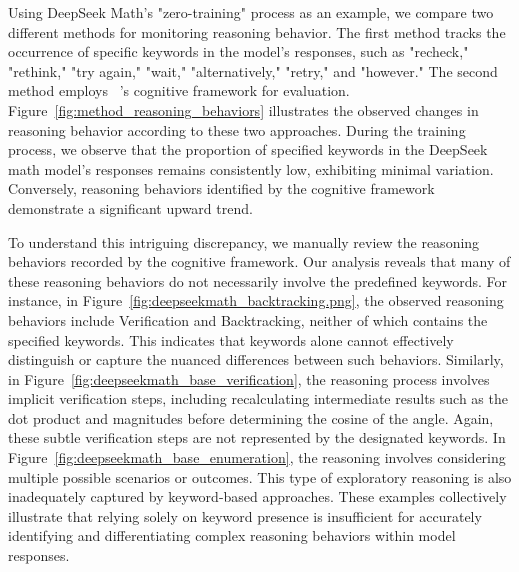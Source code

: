 

Using DeepSeek Math's "zero-training" process as an example, we compare two different methods for monitoring reasoning behavior. The first method tracks the occurrence of specific keywords in the model's responses, such as "recheck," "rethink," "try again," "wait," "alternatively," "retry," and "however." The second method employs ~\citep{gandhi2025cognitive}'s cognitive framework for evaluation. Figure~\ref{fig:method_reasoning_behaviors} illustrates the observed changes in reasoning behavior according to these two approaches. During the training process, we observe that the proportion of specified keywords in the DeepSeek math model's responses remains consistently low, exhibiting minimal variation. Conversely, reasoning behaviors identified by the cognitive framework demonstrate a significant upward trend.

To understand this intriguing discrepancy, we manually review the reasoning behaviors recorded by the cognitive framework. Our analysis reveals that many of these reasoning behaviors do not necessarily involve the predefined keywords. For instance, in Figure~\ref{fig:deepseekmath_backtracking.png}, the observed reasoning behaviors include Verification and Backtracking, neither of which contains the specified keywords. This indicates that keywords alone cannot effectively distinguish or capture the nuanced differences between such behaviors. Similarly, in Figure~\ref{fig:deepseekmath_base_verification}, the reasoning process involves implicit verification steps, including recalculating intermediate results such as the dot product and magnitudes before determining the cosine of the angle. Again, these subtle verification steps are not represented by the designated keywords. In Figure~\ref{fig:deepseekmath_base_enumeration}, the reasoning involves considering multiple possible scenarios or outcomes. This type of exploratory reasoning is also inadequately captured by keyword-based approaches.
These examples collectively illustrate that relying solely on keyword presence is insufficient for accurately identifying and differentiating complex reasoning behaviors within model responses.







